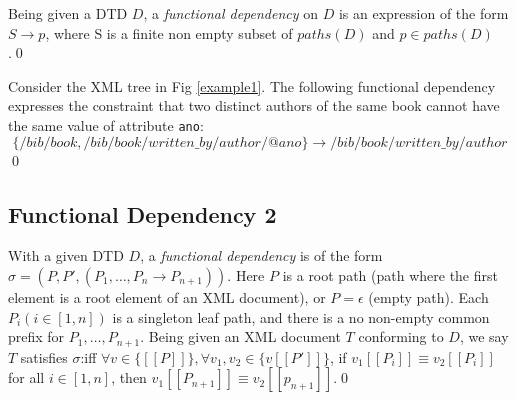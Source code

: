 \begin{define}\label{fd1}
Being given a DTD $D$, a {\sl functional dependency} on $D$ is an expression of the form $S \rightarrow p$, where S is a finite non empty subset of $paths(D)$ and $p \in paths(D)$.\qed
\end{define}

\begin{example}\label{fdExample}
Consider the XML tree in Fig \ref{example1}. The following functional dependency expresses the constraint that two distinct authors of the same book cannot have the same value of attribute \texttt{ano}:$$\{/bib/book, /bib/book/written\_by/author/@ano\} \rightarrow /bib/book/written\_by/author$$\qed
\end{example}

\subsection{Functional Dependency 2}

\begin{define}\label{fd2}
With a given DTD $D$, a {\sl functional dependency} is of the form $\sigma = (P, P', (P_1, \dots, P_n \rightarrow P_{n+1}))$. Here $P$ is a  root path (path where the first element is a root element of an XML document), or $P = \epsilon$ (empty path). Each $P_i (i \in [1,n])$ is a singleton leaf path, and there is a no non-empty common prefix for $P_1, \dots, P_{n+1}$. Being given an XML document $T$ conforming to $D$, we say $T$ satisfies $\sigma$:iff $\forall v \in \{[\![P]\!]\}, \forall v_1, v_2 \in \{v[\![P']\!]\}$, if $v_1[\![P_i]\!] \equiv v_2[\![P_i]\!]$ for all $i \in [1,n]$, then $v_1[\![P_{n+1}]\!] \equiv v_2[\![p_{n+1}]\!]$.\qed
\end{define}
